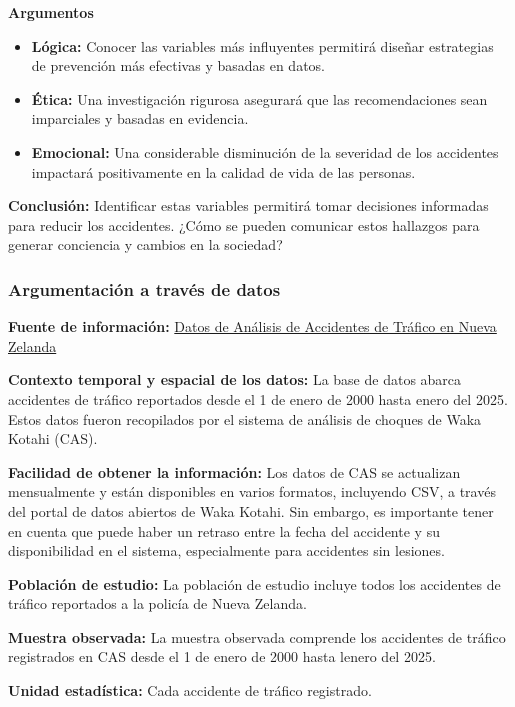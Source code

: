 \documentclass{book}
\begin{document}
\textbf{Argumentos}
\begin{itemize}
    \item \textbf{Lógica:} Conocer las variables más influyentes permitirá diseñar estrategias de prevención más efectivas y basadas en datos.
    \item \textbf{Ética:} Una investigación rigurosa asegurará que las recomendaciones sean imparciales y basadas en evidencia.
    \item \textbf{Emocional:} Una considerable disminución de la severidad de los accidentes impactará positivamente en la calidad de vida de las personas.
\end{itemize}

\textbf{Conclusión:} Identificar estas variables permitirá tomar decisiones informadas para reducir los accidentes. ¿Cómo se pueden comunicar estos hallazgos para generar conciencia y cambios en la sociedad?

\subsubsection{Argumentación a través de datos}

\textbf{Fuente de información:} \href{https://www.kaggle.com/datasets/maryamrahmani/crash-analysis-system-cas-data-new-zealand}{Datos de Análisis de Accidentes de Tráfico en Nueva Zelanda}

\textbf{Contexto temporal y espacial de los datos:} La base de datos abarca accidentes de tráfico reportados desde el 1 de enero de 2000 hasta enero del 2025. Estos datos fueron recopilados por el sistema de análisis de choques de Waka Kotahi (CAS).

\textbf{Facilidad de obtener la información:} Los datos de CAS se actualizan mensualmente y están disponibles en varios formatos, incluyendo CSV, a través del portal de datos abiertos de Waka Kotahi. Sin embargo, es importante tener en cuenta que puede haber un retraso entre la fecha del accidente y su disponibilidad en el sistema, especialmente para accidentes sin lesiones.

\textbf{Población de estudio:} La población de estudio incluye todos los accidentes de tráfico reportados a la policía de Nueva Zelanda.

\textbf{Muestra observada:} La muestra observada comprende los accidentes de tráfico registrados en CAS desde el 1 de enero de 2000 hasta lenero del 2025.

\textbf{Unidad estadística:} Cada accidente de tráfico registrado.
\end{document}
